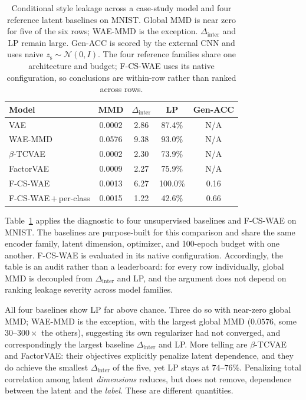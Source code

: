 \documentclass[letterpaper]{article} %
\newcommand{\ours}{F-CS-WAE}
\newcommand{\zs}{z_{\mathrm{s}}}
\newcommand{\Dinter}{\Delta_{\mathrm{inter}}}
\begin{document}
\begin{table}[t]
\centering
\small
\setlength{\tabcolsep}{4pt}
\caption{Conditional style leakage across a case-study model and four
reference latent baselines on MNIST.
Global MMD is near zero for five of the six rows; WAE-MMD is the exception.
$\Dinter$ and LP remain large. Gen-ACC is
scored by the external CNN and uses naive $\zs\sim\mathcal N(0,I)$.
The four reference families share one architecture and budget; \ours{} uses
its native configuration, so conclusions are within-row rather than ranked
across rows.}
\label{tab:cross}
\begin{tabular}{lcccc}
\toprule
Model & MMD & $\Dinter$ & LP & Gen-ACC \\
\midrule
VAE           & 0.0002 & 2.86 & 87.4\% & N/A \\
WAE-MMD       & 0.0576 & 9.38 & 93.0\% & N/A \\
$\beta$-TCVAE & 0.0002 & 2.30 & 73.9\% & N/A \\
FactorVAE     & 0.0009 & 2.27 & 75.9\% & N/A \\
\ours{}       & 0.0013 & 6.27 & 100.0\% & 0.16 \\
\midrule
\ours{}\,$+$\,per-class & 0.0015 & 1.22 & 42.6\% &
0.66 \\
\bottomrule
\end{tabular}
\end{table}

Table~\ref{tab:cross} applies the diagnostic to four unsupervised baselines
and \ours{} on MNIST. The baselines are purpose-built for this comparison
and share the same encoder family, latent dimension, optimizer, and
100-epoch budget with one another. \ours{} is evaluated in its native
configuration. Accordingly, the table is an audit rather than a leaderboard:
for every row individually, global MMD is decoupled from $\Dinter$ and LP,
and the argument does not depend on ranking leakage severity across model
families.

All four baselines show LP far above chance. Three do so with near-zero
global MMD; WAE-MMD is the exception, with the largest global MMD
($0.0576$, some $30$--$300\times$ the
others), suggesting its own regularizer had not converged, and correspondingly
the largest baseline $\Dinter$ and LP. More telling are $\beta$-TCVAE and
FactorVAE: their objectives explicitly penalize latent dependence, and they
do achieve the smallest $\Dinter$ of the five, yet LP stays at $74$--$76\%$.
Penalizing total correlation among latent \emph{dimensions} reduces, but does
not remove, dependence between the latent and the \emph{label}. These are
different quantities.
\end{document}
